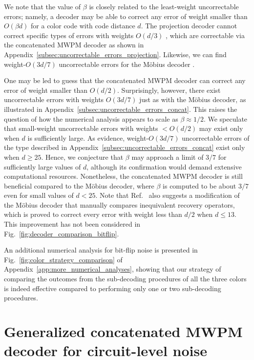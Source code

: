 \documentclass[a4paper,twocolumn,11pt,accepted=2025-01-21]{quantumarticle}
\theoremstyle{definition}
\theoremstyle{definition}
\theoremstyle{definition}
\begin{document}
We note that the value of $\beta$ is closely related to the least-weight uncorrectable errors; namely, a decoder may be able to correct any error of weight smaller than $O(\beta d)$ for a color code with code distance $d$.
The projection decoder cannot correct specific types of errors with weights $O(d/3)$ \cite{beverland2021cost,sahay2022decoder}, which are correctable via the concatenated MWPM decoder as shown in Appendix~\ref{subsec:uncorrectable_errors_projection}.
Likewise, we can find weight-$O(3d/7)$ uncorrectable errors for the Möbius decoder \cite{sahay2022decoder}.

One may be led to guess that the concatenated MWPM decoder can correct any error of weight smaller than $O(d/2)$. 
Surprisingly, however, there exist uncorrectable errors with weights $O(3d/7)$ just as with the Möbius decoder, as illustrated in Appendix~\ref{subsec:uncorrectable_errors_concat}.
This raises the question of how the numerical analysis appears to scale as $\beta \approx 1/2$.
We speculate that small-weight uncorrectable errors with weights $< O(d/2)$ may exist only when $d$ is sufficiently large.
As evidence, weight-$O(3d/7)$ uncorrectable errors of the type described in Appendix~\ref{subsec:uncorrectable_errors_concat} exist only when $d \geq 25$.
Hence, we conjecture that $\beta$ may approach a limit of $3/7$ for sufficiently large values of $d$, although its confirmation would demand extensive computational resources.
Nonetheless, the concatenated MWPM decoder is still beneficial compared to the Möbius decoder, where $\beta$ is computed to be about $3/7$ even for small values of $d < 25$.
Note that Ref.~\cite{sahay2022decoder} also suggests a modification of the Möbius decoder that manually compares inequivalent recovery operators, which is proved to correct every error with weight less than $d/2$ when $d \leq 13$.
This improvement has not been considered in Fig.~\ref{fig:decoder_comparison_bitflip}.

An additional numerical analysis for bit-flip noise is presented in Fig.~\ref{fig:color_strategy_comparison} of Appendix~\ref{app:more_numerical_analyses}, showing that our strategy of comparing the outcomes from the sub-decoding procedures of all the three colors is indeed effective compared to performing only one or two sub-decoding procedures.

\section{Generalized concatenated MWPM decoder for circuit-level noise \label{sec:decoder_circuit_level}}
\end{document}

